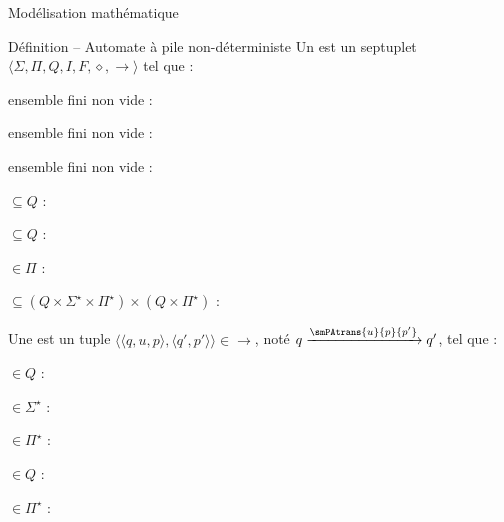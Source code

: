 
\begingroup

\begin{frame}{Modélisation mathématique}

  \vspace{-2mm}
  \begin{block}{Définition -- Automate à pile non-déterministe}
    Un  est un septuplet \alert{$\langle \Sigma, \Pi, Q, I, F, \diamond, \rightarrow \rangle$} tel que :
    \begin{description}[xxxx]
    \item[\alert{$\Sigma$}] ensemble fini non vide : 
    \item[\alert{$\Pi$}] ensemble fini non vide : 
    \item[\alert{$Q$}] ensemble fini non vide : 
    \item[\alert{$I$}] $\subseteq Q$ : 
    \item[\alert{$F$}] $\subseteq Q$ : 
    \item[\alert{$\diamond$}] $\in \Pi$ : 
    \item[\alert{$\rightarrow$}] $\subseteq  (Q \times \Sigma^\star \times \Pi^\star) \times (Q \times \Pi^\star)$ : 
    \end{description}

    \vspace{-1mm}
    Une  est un tuple \alert{$\langle \langle q, u, p \rangle, \langle q', p' \rangle \rangle \in \rightarrow$}, noté \alert{$q \xrightarrow{\smPAtrans{u}{p}{p'}} q'$}, tel que :
    \begin{description}[xxxx]
    \item[\alert{$q$}] $\in Q$ : 
    \item[\alert{$u$}] $\in \Sigma^\star$ : 
    \item[\alert{$p$}] $\in \Pi^\star$ : 
    \item[\alert{$q'$}] $\in Q$ : 
    \item[\alert{$p'$}] $\in \Pi^\star$ : 
    \end{description}
  \end{block}


\end{frame}

\endgroup
